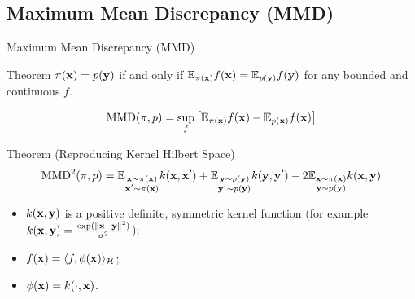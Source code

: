 \subsection{Maximum Mean Discrepancy (MMD)}
\begin{frame}{Maximum Mean Discrepancy (MMD)}
	\begin{block}{Theorem}
		$\pi(\mathbf{x}) = p(\mathbf{y})$ if and only if $\mathbb{E}_{\pi(\mathbf{x})} f(\mathbf{x}) = \mathbb{E}_{p(\mathbf{y})} f(\mathbf{y})$ for any bounded and continuous $f$.
	\end{block}
	\vspace{-0.3cm}
	\[
		\text{MMD}(\pi, p) = \sup_f \left[ \mathbb{E}_{\pi(\mathbf{x})} f(\mathbf{x}) - \mathbb{E}_{p(\mathbf{x})} f(\mathbf{x}) \right]
	\]	
	\vspace{-0.3cm}
	\begin{block}{Theorem (Reproducing Kernel Hilbert Space)}
		\vspace{-0.6cm}
		\[
			\text{MMD}^2(\pi, p) = \mathbb{E}_{\substack{\mathbf{x} \sim\pi(\mathbf{x}) \\ \mathbf{x}' \sim\pi(\mathbf{x})}} k(\mathbf{x}, \mathbf{x}') + \mathbb{E}_{\substack{\mathbf{y} \sim p(\mathbf{y}) \\ \mathbf{y}' \sim p(\mathbf{y})}} k(\mathbf{y}, \mathbf{y}') - 2 \mathbb{E}_{\substack{\mathbf{x} \sim\pi(\mathbf{x}) \\ \mathbf{y} \sim p(\mathbf{y})}} k(\mathbf{x}, \mathbf{y})
		\]
		\begin{itemize}
			\item $k(\mathbf{x}, \mathbf{y})$ is a positive definite, symmetric kernel function (for example $k(\mathbf{x}, \mathbf{y}) = \frac{\exp(\|\mathbf{x} - \mathbf{y}\|^2)}{\sigma^2}$);
			\item $f(\mathbf{x}) = \langle f, \phi(\mathbf{x}) \rangle_{\mathcal{H}}$;
			\item $\phi(\mathbf{x}) = k(\cdot, \mathbf{x})$.
		\end{itemize} 
		\vspace{-0.3cm}
	\end{block}
\end{frame}
